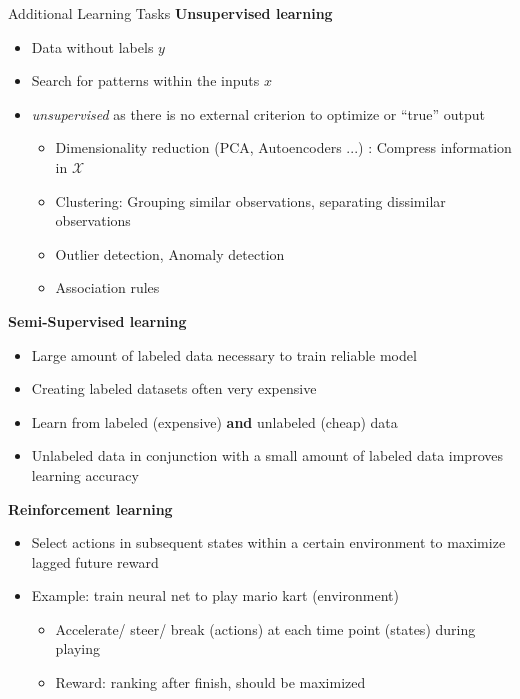 \begin{vbframe}{Additional Learning Tasks}
\lz
  \textbf{Unsupervised learning}
    \begin{itemize}
      \item Data without labels $y$
      \item Search for patterns within the inputs $x$
      \item \textit{unsupervised} as there is no external criterion to optimize or \enquote{true} output
      \begin{itemize}
        \item Dimensionality reduction (PCA, Autoencoders ...) : Compress information in $\mathcal X$
        \item Clustering: Grouping similar observations, separating dissimilar observations
        \item Outlier detection, Anomaly detection
        \item Association rules
      \end{itemize}
    \end{itemize}
\framebreak
\lz
  \textbf{Semi-Supervised learning}
  \begin{itemize}
    \item Large amount of labeled data necessary to train reliable model
    \item Creating labeled datasets often very expensive
    \item Learn from labeled (expensive) \textbf{and} unlabeled (cheap) data
    \item Unlabeled data in conjunction with a small amount of labeled data improves learning accuracy
  \end{itemize}
  \vspace{0.5cm}
  \textbf{Reinforcement learning}
  \begin{itemize}
    \item Select actions in subsequent  states within a certain environment to maximize lagged future reward
    \item Example: train neural net to play mario kart (environment)
    \begin{itemize}
      \item Accelerate/ steer/ break (actions) at each time point (states) during playing
      \item Reward: ranking after finish, should be maximized
    \end{itemize}
  \end{itemize}
\end{vbframe}





\endlecture

